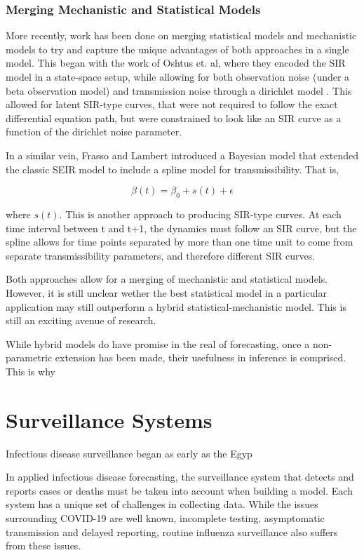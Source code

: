 \documentclass{umassthesis}          %
\begin{document}
\subsubsection{Merging Mechanistic and Statistical Models}

More recently, work has been done on merging statistical models and mechanistic models to try and capture the unique advantages of both approaches in a single model. This began with the work of Oshtus et. al, where they encoded the SIR model in a state-space setup, while allowing for both observation noise (under a beta observation model) and transmission noise through a dirichlet model \cite{osthus2017forecasting}. This allowed for latent SIR-type curves, that were not required to follow the exact differential equation path, but were constrained to look like an SIR curve as a function of the dirichlet noise parameter. 

In a similar vein, Frasso and Lambert introduced a Bayesian model that extended the classic SEIR model to include a spline model for transmissibility. That is, 

\begin{equation}
\beta(t) = \beta_0 + s(t) + \epsilon
\end{equation}

where $s(t)$. This is another approach to producing SIR-type curves. At each time interval between t and t+1, the dynamics must follow an SIR curve, but the spline allows for time points separated by more than one time unit to come from separate transmissibility parameters, and therefore different SIR curves. 

Both approaches allow for a merging of mechanistic and statistical models. However, it is still unclear wether the best statistical model in a particular application may still outperform a hybrid statistical-mechanistic model. This is still an exciting avenue of research.

While hybrid models do have promise in the real of forecasting, once a non-parametric extension has been made, their usefulness in inference is comprised. This is why 

\section{Surveillance Systems}

Infectious disease surveillance began as early as the Egyp

In applied infectious disease forecasting, the surveillance system that detects and reports cases or deaths must be taken into account when building a model. Each system has a unique set of challenges in collecting data. While the issues surrounding COVID-19 are well known, incomplete testing, asymptomatic transmission and delayed reporting, routine influenza surveillance also suffers from these issues. 
\end{document}
